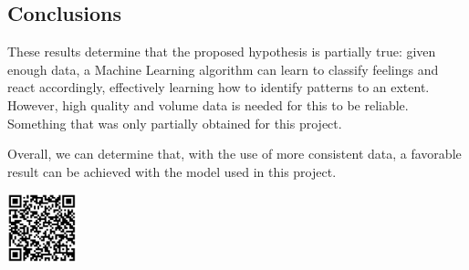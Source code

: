 \documentclass[a4]{sciposter}
\begin{document}
\begin{multicols}{3}
\section{Conclusions}

These results determine that the proposed hypothesis is partially true: given enough data, a Machine Learning algorithm can learn to classify feelings and react accordingly, effectively learning how to identify patterns to an extent. However, high quality and volume data is needed for this to be reliable. Something that was only partially obtained for this project.

Overall, we can determine that, with the use of more consistent data, a favorable result can be achieved with the model used in this project.




\hspace*{120mm}\includegraphics[width=0.15\textwidth]{qrcode.png}

\end{multicols}
\end{document}
